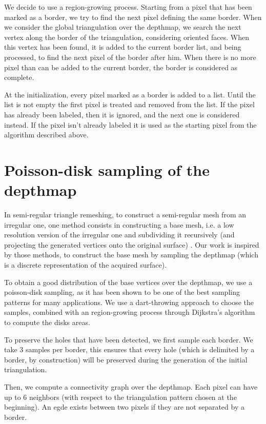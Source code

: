 \documentclass[11pt,fleqn]{book} %
\begin{document}
We decide to use a region-growing process. Starting from a pixel that has been marked as a border, we try to find the next pixel defining the same border. When we consider the global triangulation over the depthmap, we search the next vertex along the border of the triangulation, considering oriented faces.
When this vertex has been found, it is added to the current border list, and being processed, to find the next pixel of the border after him.
When there is no more pixel than can be added to the current border, the border is considered as complete.

At the initialization, every pixel marked as a border is added to a list. Until the list is not empty the first pixel is treated and removed from the list. If the pixel has already been labeled, then it is ignored, and the next one is considered instead. If the pixel isn't already labeled it is used as the starting pixel from the algorithm described above.

\section{Poisson-disk sampling of the depthmap}
\label{sec:poisson_sampling}

In semi-regular triangle remeshing, to construct a semi-regular mesh from an irregular one, one method consists in constructing a base mesh, i.e. a low resolution version of the irregular one and subdividing it recursively (and projecting the generated vertices onto the original surface) \cite{PRS15}. Our work is inspired by those methods, to construct the base mesh by sampling the depthmap (which is a discrete representation of the acquired surface).

To obtain a good distribution of the base vertices over the depthmap, we use a poisson-disk sampling, as it has been shown to be one of the best sampling patterns for many applications. 
We use a dart-throwing approach to choose the samples, combined with an region-growing process through Dijkstra's algorithm \cite{Dij59} to compute the disks areas.

To preserve the holes that have been detected, we first sample each border. We take 3 samples per border, this ensures that every hole (which is delimited by a border, by construction) will be preserved during the generation of the initial triangulation.

Then, we compute a connectivity graph over the depthmap. Each pixel can have up to 6 neighbors (with respect to the triangulation pattern chosen at the beginning).
An egde exists between two pixels if they are not separated by a border.
\end{document}
